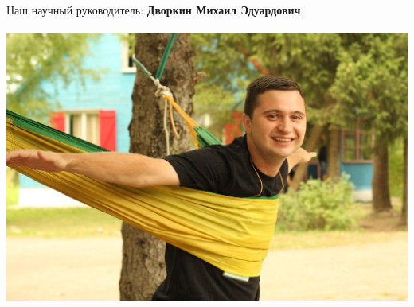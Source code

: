 \documentclass[12pt]{report}
\begin{document}
    

    \newpage %

    Наш научный руководитель: { \bf Дворкин Михаил Эдуардович } \\
    \\
    \includegraphics[scale=0.5]{dvorkin2.jpg}\hfill
    

        
\end{document}
